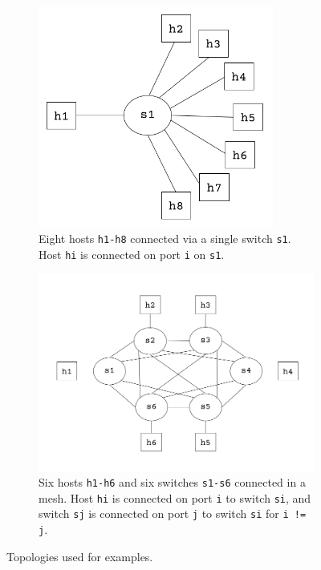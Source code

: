 \documentclass{article}
\begin{document}
\begin{figure}[h]
\centering
\begin{subfigure}[]{0.45\textwidth}
\centering
\includegraphics[width=0.85\textwidth]{topo1.png}
\caption{Eight hosts \texttt{h1-h8} connected via a single switch \texttt{s1}.
Host \texttt{hi} is connected on port \texttt{i} on \texttt{s1}.}
\label{fig:topo_1}
\end{subfigure}
\hfill
\begin{subfigure}[]{0.54\textwidth}
\centering
\includegraphics[width=1\textwidth]{topo2.png}
\caption{Six hosts \texttt{h1-h6} and six switches \texttt{s1-s6} 
connected in a mesh. Host \texttt{hi} is connected on port \texttt{i} to
switch \texttt{si}, and switch \texttt{sj} is connected on port \texttt{j}
to switch \texttt{si} for \texttt{i != j}.}
\label{fig:topo_2}
\end{subfigure}
\caption{Topologies used for examples.}
\label{fig:topologies}
\end{figure}
\end{document}

